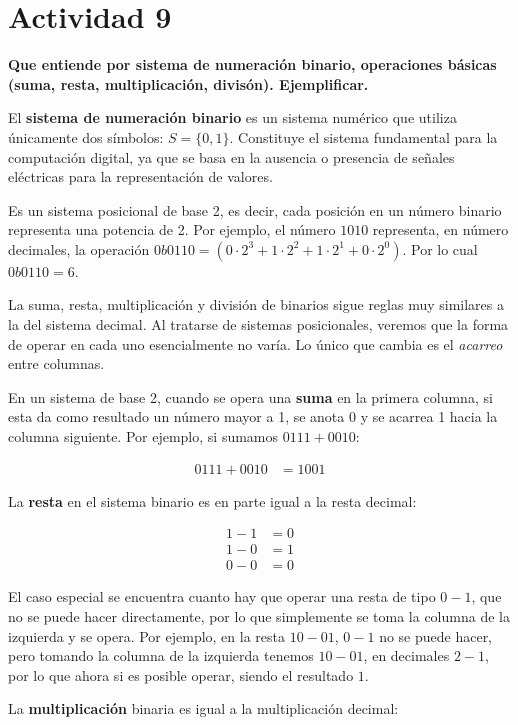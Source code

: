 \section*{Actividad 9}
\textbf{Que entiende por sistema de numeración binario, operaciones básicas (suma, resta, multiplicación, divisón). Ejemplificar.}

El \textbf{sistema de numeración binario} es un sistema numérico que utiliza únicamente dos símbolos: $S=\{0,1\}$. Constituye el sistema fundamental para la computación digital, ya que se basa en la ausencia o presencia de señales eléctricas para la representación de valores.

Es un sistema posicional de base 2, es decir, cada posición en un número binario representa una potencia de 2. Por ejemplo, el número $1010$ representa, en número decimales, la operación $0b0110 = (0 \cdot 2^{3} + 1 \cdot 2^{2} + 1 \cdot 2^{1} + 0 \cdot 2^{0})$. Por lo cual $0b0110 = 6$. 

La suma, resta, multiplicación y división de binarios sigue reglas muy similares a la del sistema decimal. Al tratarse de sistemas posicionales, veremos que la forma de operar en cada uno esencialmente no varía. Lo único que cambia es el \textit{acarreo} entre columnas. 

En un sistema de base 2, cuando se opera una \textbf{suma} en la primera columna, si esta da como resultado un número mayor a 1, se anota 0 y se acarrea 1 hacia la columna siguiente. Por ejemplo, si sumamos $0111 + 0010$:

\begin{align*}
0111 + 0010 &= 1001
\end{align*}

La \textbf{resta} en el sistema binario es en parte igual a la resta decimal: 

\begin{align*}
1 - 1 &= 0\\
1 - 0 &= 1\\
0 - 0 &= 0
\end{align*}

El caso especial se encuentra cuanto hay que operar una resta de tipo $0 - 1$, que no se puede hacer directamente, por lo que simplemente se toma la columna de la izquierda y se opera. Por ejemplo, en la resta $10 - 01$, $0 - 1$ no se puede hacer, pero tomando la columna de la izquierda tenemos $10 - 01$, en decimales $2 - 1$, por lo que ahora si es posible operar, siendo el resultado $1$.

La \textbf{multiplicación} binaria es igual a la multiplicación decimal:

